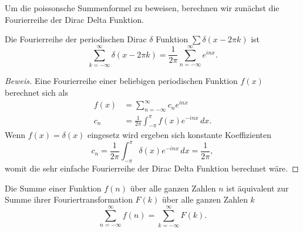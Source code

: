 Um die poissonsche Summenformel zu beweisen, berechnen wir zunächst die Fourierreihe der Dirac Delta Funktion.

\begin{lemma}
    Die Fourierreihe der periodischen Dirac $\delta$ Funktion $\sum \delta(x - 2\pi k)$ ist
    \begin{equation} \label{zeta:equation:fourier_dirac}
        \sum_{k=-\infty}^{\infty}
        \delta(x - 2\pi k)
        =
        \frac{1}{2\pi}
        \sum_{n=-\infty}^{\infty}
        e^{i n x}.
    \end{equation}
\end{lemma}

\begin{proof}[Beweis]
    Eine Fourierreihe einer beliebigen periodischen Funktion $f(x)$ berechnet sich als
    \begin{align}
        f(x)
        &=
        \sum_{n=-\infty}^{\infty}
        c_n
        e^{i n x} \\
        c_n
        &=
        \frac{1}{2\pi}
        \int_{-\pi}^{\pi}
        f(x)
        e^{-i n x}
        \, dx.
    \end{align}
    Wenn $f(x)=\delta(x)$ eingesetz wird ergeben sich konstante Koeffizienten
    \begin{equation}
        c_n
        =
        \frac{1}{2\pi}
        \int_{-\pi}^{\pi}
        \delta(x)
        e^{-i n x}
        \, dx
        =
        \frac{1}{2\pi},
    \end{equation}
    womit die sehr einfache Fourierreihe der Dirac Delta Funktion berechnet wäre.
\end{proof}

\begin{satz}
    Die Summe einer Funktion $f(n)$ über alle ganzen Zahlen $n$ ist äquivalent zur Summe ihrer Fouriertransformation $F(k)$ über alle ganzen Zahlen $k$
    \begin{equation}
        \sum_{n=-\infty}^{\infty}
        f(n)
        =
        \sum_{k=-\infty}^{\infty}
        F(k).
    \end{equation}
\end{satz}

